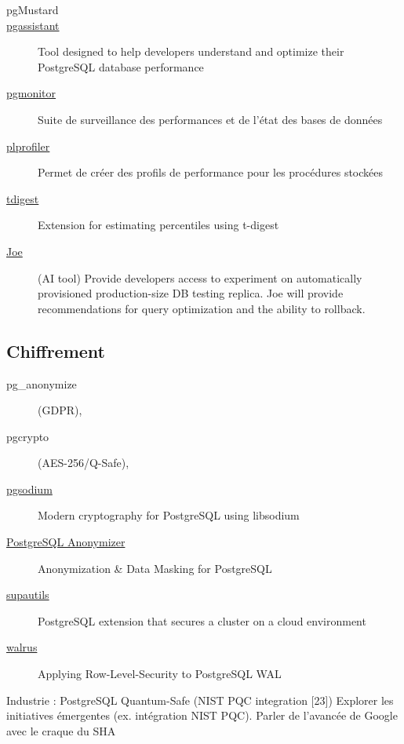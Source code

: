 \documentclass[a4paper,12pt]{article}
\begin{document}
\begin{multicols*}{2}
\begin{description}
\item[{pgMustard}] 

\item[{\href{https://github.com/nexsol-technologies/pgassistant}{pgassistant}}] Tool designed to help developers understand and optimize their PostgreSQL database performance
\item[{\href{https://github.com/CrunchyData/pgmonitor-extension}{pgmonitor}}] Suite de surveillance des performances et de l'état des bases de données
\item[{\href{https://github.com/bigsql/plprofiler}{plprofiler}}] Permet de créer des profils de performance pour les procédures stockées
\item[{\href{https://github.com/tvondra/tdigest}{tdigest}}] Extension for estimating percentiles using t-digest
\item[{\href{https://gitlab.com/postgres-ai/joe}{Joe}}] (AI tool) Provide developers access to experiment on automatically provisioned production-size DB testing replica. Joe will provide recommendations for query optimization and the ability to rollback.
\end{description}
\subsection*{Chiffrement}
\label{sec:org528f3e7}
\begin{description}
\item[{pg\_anonymize}] (GDPR),
\item[{pgcrypto}] (AES-256/Q-Safe),
\item[{\href{https://github.com/michelp/pgsodium}{pgsodium}}] Modern cryptography for PostgreSQL using libsodium
\item[{\href{https://gitlab.com/dalibo/postgresql\_anonymizer}{PostgreSQL Anonymizer}}] Anonymization \& Data Masking for PostgreSQL
\item[{\href{https://github.com/supabase/supautils}{supautils}}] PostgreSQL extension that secures a cluster on a cloud environment
\item[{\href{https://github.com/supabase/walrus}{walrus}}] Applying Row-Level-Security to PostgreSQL WAL
\end{description}

Industrie : PostgreSQL Quantum-Safe (NIST PQC integration [23])
Explorer les initiatives émergentes (ex. intégration NIST PQC).
Parler de l'avancée de Google avec le craque du SHA

\end{multicols*}
\end{document}
